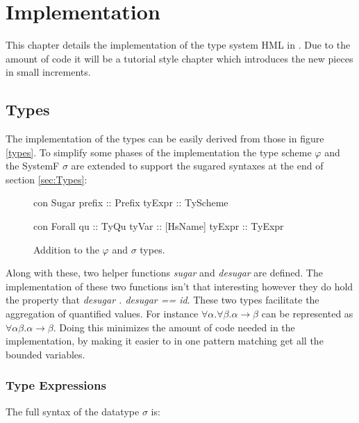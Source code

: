 \chapter{Implementation}
This chapter details the implementation of the type system HML in \rcore. Due to the amount of code it will be a tutorial style chapter which introduces the new pieces in small increments.
\section{Types}
The implementation of the types can be easily derived from those in figure \ref{types}. To simplify some phases of the implementation the type scheme $\varphi$ and the SystemF $\sigma$ are extended to support the sugared syntaxes at the end of section \ref{sec:Types}:

\begin{figure}[H]
\begin{minipage}[t]{0.4\linewidth}
\begin{code}
  con Sugar
     prefix  :: Prefix
     tyExpr  :: TyScheme
\end{code}
\end{minipage}
\begin{minipage}[t]{0.6\linewidth}
\begin{code}
  con Forall
    qu        :: TyQu
    tyVar     :: [HsName]
    tyExpr    :: TyExpr 
\end{code} 
\end{minipage}
\caption{Addition to the $\varphi$ and $\sigma$ types.}
\label{abs:fig:types}
\end{figure}

Along with these, two helper functions \emph{sugar} and \emph{desugar} are defined. The implementation of these two functions isn't that interesting however they do hold the property that \emph{desugar . desugar == id}. These two types facilitate the aggregation of quantified values. For instance $\forall \alpha . \forall \beta. \alpha \rightarrow \beta$ can be represented as $\forall \alpha \beta . \alpha \rightarrow \beta$. Doing this minimizes the amount of code needed in the implementation, by making it easier to in one pattern matching get all the bounded variables.
\subsection{Type Expressions}
The full syntax of the datatype $\sigma$ is:

